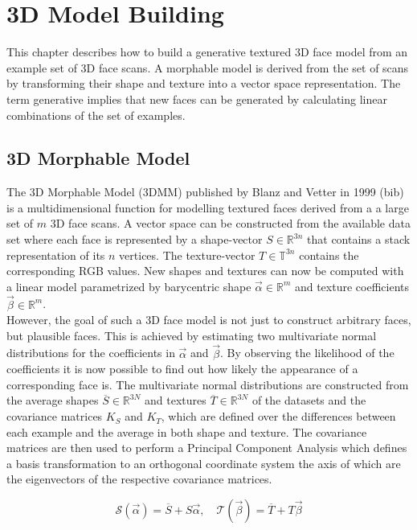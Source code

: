 \chapter{3D Model Building}
This chapter describes how to build a generative textured 3D face model from an example set of 3D face scans. A morphable model is derived from the set of scans by transforming their shape and texture into a vector space representation. The term generative implies that new faces can be generated by calculating linear combinations of the set of examples. 

\section{3D Morphable Model}
The 3D Morphable Model (3DMM) published by Blanz and Vetter in 1999 (bib) is a multidimensional function for modelling textured faces derived from a a large set of $m$ 3D face scans. A vector space can be constructed from the available data set where each face is  represented by a shape-vector $S \in \mathbb{R}^{3n}$ that contains a stack representation of its $n$ vertices. The texture-vector $T \in \mathbb{T}^{3n}$ contains the corresponding RGB values. New shapes and textures can now be computed
with a linear model parametrized by barycentric shape $\vec\alpha \in \mathbb{R}^{m}$ and texture coefficients $\vec\beta \in \mathbb{R}^{m}$.\\
However, the goal of such a 3D face model is not just to construct arbitrary faces, but plausible faces. This is achieved by estimating two multivariate normal distributions for the coefficients in $\vec\alpha$ and $\vec\beta$.
By observing the likelihood of the coefficients it is now possible to find out how likely the appearance of a corresponding face is.
The multivariate normal distributions are constructed from the average shapes $\overline{S} \in \mathbb{R}^{3N}$ and textures $\overline{T} \in \mathbb{R}^{3N}$ of the datasets and the covariance matrices $K_{S}$ and $K_{T}$, which are defined over the differences between each example and the average in both shape and texture.
The covariance matrices are then used to perform a Principal Component Analysis which defines a basis transformation to an orthogonal coordinate system the axis of which are the eigenvectors of the respective covariance matrices.

\begin{equation}
\label{eq:MM}
\mathcal{S}(\vec\alpha)=\overline{S}+S\vec\alpha, \quad \mathcal{T}(\vec\beta)=\overline{T}+T\vec\beta
\end{equation}

